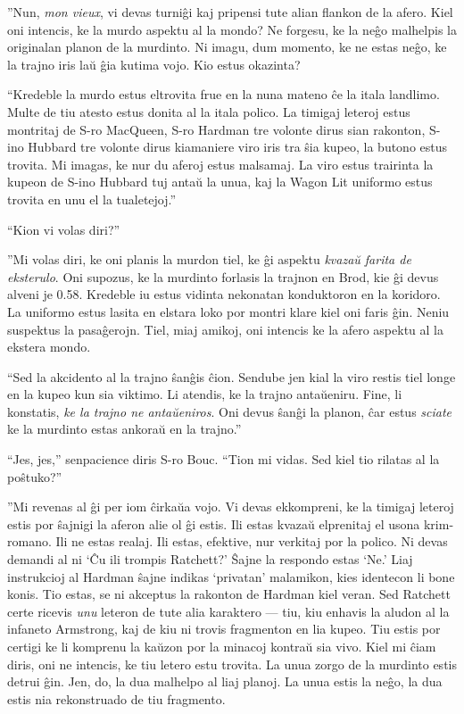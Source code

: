 ''Nun, \emph{mon vieux}, vi devas turniĝi kaj pripensi tute alian flankon de la afero. Kiel oni intencis, ke la murdo aspektu al la mondo? Ne forgesu, ke la neĝo malhelpis la originalan planon de la murdinto. Ni imagu, dum momento, ke ne estas neĝo, ke la trajno iris laŭ ĝia kutima vojo. Kio estus okazinta?

``Kredeble la murdo estus eltrovita frue en la nuna mateno ĉe la itala landlimo. Multe de tiu atesto estus donita al la itala polico. La timigaj leteroj estus montritaj de S-ro MacQueen, S-ro Hardman tre volonte dirus sian rakonton, S-ino Hubbard tre volonte dirus kiamaniere viro iris tra ŝia kupeo, la butono estus trovita. Mi imagas, ke nur du aferoj estus malsamaj. La viro estus trairinta la kupeon de S-ino Hubbard tuj antaŭ la unua, kaj la Wagon Lit uniformo estus trovita en unu el la tualetejoj.''

``Kion vi volas diri?''

''Mi volas diri, ke oni planis la murdon tiel, ke ĝi aspektu \emph{kvazaŭ farita de eksterulo}. Oni supozus, ke la murdinto forlasis la trajnon en Brod, kie ĝi devus alveni je 0.58. Kredeble iu estus vidinta nekonatan konduktoron en la koridoro. La uniformo estus lasita en elstara loko por montri klare kiel oni faris ĝin. Neniu suspektus la pasaĝerojn. Tiel, miaj amikoj, oni intencis ke la afero aspektu al la ekstera mondo.

``Sed la akcidento al la trajno ŝanĝis ĉion. Sendube jen kial la viro restis tiel longe en la kupeo kun sia viktimo. Li atendis, ke la trajno antaŭeniru. Fine, li konstatis, \emph{ke la trajno ne antaŭeniros}. Oni devus ŝanĝi la planon, ĉar estus \emph{sciate} ke la murdinto estas ankoraŭ en la trajno.''

``Jes, jes,'' senpacience diris S-ro Bouc. ``Tion mi vidas. Sed kiel tio rilatas al la poŝtuko?''

''Mi revenas al ĝi per iom ĉirkaŭa vojo. Vi devas ekkompreni, ke la timigaj leteroj estis por ŝajnigi la aferon alie ol ĝi estis. Ili estas kvazaŭ elprenitaj el usona krim-romano. Ili ne estas realaj. Ili estas, efektive, nur verkitaj por la polico. Ni devas demandi al ni `Ĉu ili trompis Ratchett?' Ŝajne la respondo estas `Ne.' Liaj instrukcioj al Hardman ŝajne indikas `privatan' malamikon, kies identecon li bone konis. Tio estas, se ni akceptus la rakonton de Hardman kiel veran. Sed Ratchett certe ricevis \emph{unu} leteron de tute alia karaktero --- tiu, kiu enhavis la aludon al la infaneto Armstrong, kaj de kiu ni trovis fragmenton en lia kupeo. Tiu estis por certigi ke li komprenu la kaŭzon por la minacoj kontraŭ sia vivo. Kiel mi ĉiam diris, oni ne intencis, ke tiu letero estu trovita. La unua zorgo de la murdinto estis detrui ĝin. Jen, do, la dua malhelpo al liaj planoj. La unua estis la neĝo, la dua estis nia rekonstruado de tiu fragmento.

